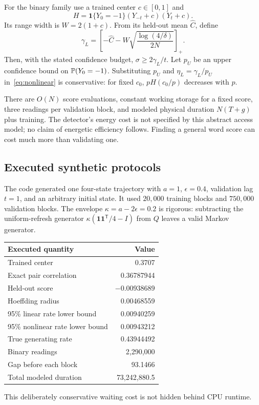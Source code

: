 \documentclass[11pt,a4paper]{article}
\newcommand{\one}{\mathbf 1}\newcommand{\KL}{D_{\mathrm{KL}}}
\begin{document}
For the binary family use a trained center $c\in[0,1]$ and
\[
H=\one\{Y_0=-1\}(Y_{-t}+c)(Y_t+c).
\]
Its range width is $W=2(1+c)$. From its held-out mean $\widehat C$, define
\[
\gamma_L=\left[-\widehat C-W\sqrt{\frac{\log(4/\delta)}{2N}}\right]_+.
\]
Then, with the stated confidence budget, $\sigma\geq2\gamma_L/t$. Let $p_U$ be an upper confidence bound on $\mathbb P(Y_0=-1)$. Substituting $p_U$ and $\eta_L=\gamma_L/p_U$ in~\eqref{eq:nonlinear} is conservative: for fixed $c_0$, $pH(c_0/p)$ decreases with $p$.

There are $O(N)$ score evaluations, constant working storage for a fixed score, three readings per validation block, and modeled physical duration $N(T+g)$ plus training. The detector's energy cost is not specified by this abstract access model; no claim of energetic efficiency follows. Finding a general word score can cost much more than validating one.

\subsection{Executed synthetic protocols}
The code generated one four-state trajectory with $a=1$, $\epsilon=0.4$, validation lag $t=1$, and an arbitrary initial state. It used $20{,}000$ training blocks and $750{,}000$ validation blocks. The envelope $\kappa=a-2\epsilon=0.2$ is rigorous: subtracting the uniform-refresh generator $\kappa(\one\one^{\mathsf T}/4-I)$ from $Q$ leaves a valid Markov generator.
\begin{center}\begin{tabular}{lr}\toprule
Executed quantity&Value\\\midrule
Trained center&0.3707\\
Exact pair correlation&0.36787944\\
Held-out score&$-0.00938689$\\
Hoeffding radius&0.00468559\\
95\% linear rate lower bound&0.00940259\\
95\% nonlinear rate lower bound&0.00943212\\
True generating rate&0.43944492\\
Binary readings&2,290,000\\
Gap before each block&93.1466\\
Total modeled duration&73,242,880.5\\\bottomrule
\end{tabular}\end{center}
This deliberately conservative waiting cost is not hidden behind CPU runtime.
\end{document}
